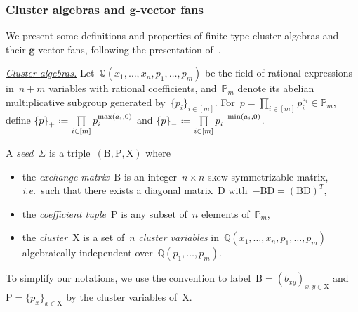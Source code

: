 \documentclass{amsart}
\theoremstyle{definition}
\newcommand{\Q}{\mathbb{Q}} %
\renewcommand{\b}[1]{{\boldsymbol{#1}}} %
\newcommand{\eqdef}{\mbox{\,\raisebox{0.2ex}{\scriptsize\ensuremath{\mathrm:}}\ensuremath{=}\,}} %
\newcommand{\ie}{\textit{i.e.}~} %
\newcommand{\darkblue}{\color{darkblue}} %
\newcommand{\defn}[1]{\textsl{\darkblue #1}} %
\newcommand{\para}[1]{\medskip\noindent\uline{\textit{#1.}}} %
\newcommand{\Trop}[1]{\mathbb{P}_{#1}} %
\newcommand{\positiveExponents}[1]{\left\{#1\right\}_+} %
\newcommand{\negativeExponents}[1]{\left\{#1\right\}_-} %
\newcommand{\seed}{\Sigma} %
\newcommand{\cluster}{\mathrm{X}} %
\newcommand{\coefficients}{\mathrm{P}} %
\newcommand{\B}{\mathrm{B}} %
\newcommand{\D}{\mathrm{D}} %
\begin{document}
\subsubsection{Cluster algebras and $\b{g}$-vector fans}

We present some definitions and properties of finite type cluster algebras and their $\b{g}$-vector fans, following the presentation of~\cite{HohlwegPilaudStella}.

\para{Cluster algebras}
%
Let~$\Q(x_1, \dots, x_n, p_1, \dots, p_m)$ be the field of rational expressions in~$n+m$ variables with rational coefficients, and~$\Trop{m}$ denote its abelian multiplicative subgroup generated by~$\{p_i\}_{i \in [m]}$.
For~$p = \prod\limits_{i \in [m]} p_i^{a_i} \in \Trop{m}$, define
\(
\positiveExponents{p} \eqdef \prod\limits_{i \in [m]} p_i^{\max(a_i,0)}
\)
and
\(
\negativeExponents{p} \eqdef \prod\limits_{i \in [m]} p_i^{-\min(a_i,0)}
\).

\medskip
A \defn{seed}~$\seed$ is a triple~$(\B, \coefficients, \cluster)$ where
\begin{itemize}
\item the \defn{exchange matrix}~$\B$ is an integer~$n \times n$ skew-symmetrizable matrix, \ie such that there exists a diagonal matrix~$\D$ with~$-\B\D = (\B\D)^T$,
\item the \defn{coefficient tuple}~$\coefficients$ is any subset of~$n$ elements of~$\Trop{m}$,
\item the \defn{cluster}~$\cluster$ is a set of~$n$ \defn{cluster variables} in~$\Q(x_1, \dots, x_n, p_1, \dots, p_m)$ algebraically independent over~$\Q(p_1, \dots, p_m)$.
\end{itemize}
To simplify our notations, we use the convention to label~$\B = (b_{xy})_{x,y \in \cluster}$ and~$\coefficients = \{p_x\}_{x \in \cluster}$ by the cluster variables of~$\cluster$.
\end{document}

